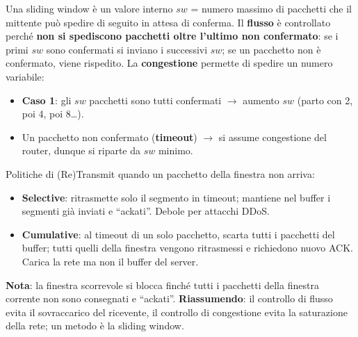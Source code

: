 \documentclass[11pt,a4paper]{report}
\begin{document}
Una sliding window è un valore interno $sw$ = numero massimo di pacchetti che il mittente può spedire di seguito in attesa di conferma. Il \textbf{flusso} è controllato perché \textbf{non si spediscono pacchetti oltre l'ultimo non confermato}: se i primi $sw$ sono confermati si inviano i successivi $sw$; se un pacchetto non è confermato, viene rispedito. La \textbf{congestione} permette di spedire un numero variabile:
\begin{itemize}[noitemsep]
\item \textbf{Caso 1}: gli $sw$ pacchetti sono tutti confermati $\to$ aumento $sw$ (parto con 2, poi 4, poi 8\dots).
\item Un pacchetto non confermato (\textbf{timeout}) $\to$ si assume congestione del router, dunque si riparte da $sw$ minimo.
\end{itemize}
Politiche di (Re)Transmit quando un pacchetto della finestra non arriva:
\begin{itemize}[noitemsep]
\item \textbf{Selective}: ritrasmette solo il segmento in timeout; mantiene nel buffer i segmenti già inviati e ``ackati''. Debole per attacchi DDoS.
\item \textbf{Cumulative}: al timeout di un solo pacchetto, scarta tutti i pacchetti del buffer; tutti quelli della finestra vengono ritrasmessi e richiedono nuovo ACK. Carica la rete ma non il buffer del server.
\end{itemize}
\textbf{Nota}: la finestra scorrevole si blocca finché tutti i pacchetti della finestra corrente non sono consegnati e ``ackati''. \textbf{Riassumendo}: il controllo di flusso evita il sovraccarico del ricevente, il controllo di congestione evita la saturazione della rete; un metodo è la sliding window.
\end{document}
